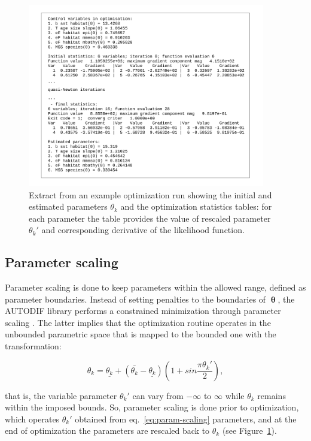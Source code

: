 \begin{figure}[H]
\begin{center}
\includegraphics[width=0.925\textwidth]{chapter4/figs/param_scaling}
\caption{Extract from an example optimization run showing the initial and estimated parameters $\theta_k$ and the optimization statistics tables: for each parameter the table provides the value of rescaled parameter $\theta_k'$ and corresponding derivative of the likelihood function.}
\label{fig:param-scaling}
\end{center}
\end{figure}

\subsection{Parameter scaling}\label{sec:parameter-boundaries}

Parameter scaling is done to keep parameters within the allowed range, defined as parameter boundaries. Instead of setting penalties to the boundaries of $\boldsymbol \uptheta$, the AUTODIF library performs a constrained minimization through parameter scaling \citep*[see e.g.,][]{Bard, Vallino}. The latter implies that the optimization routine operates in the unbounded parametric space that is mapped to the bounded one with the transformation:

\begin{equation}
\theta_k=\underline{\theta_k}+\left(\bar{\theta_k}-\underline{\theta_k}\right)\left(1+sin\frac{\pi\theta_k'}{2}
\right),
\label{eq:param-scaling}
\end{equation}

\noindent that is, the variable parameter $\theta_k'$ can vary from $-\infty$ to $\infty$ while $\theta_k$ remains within the imposed  bounds. So, parameter scaling is done prior to optimization, which operates $\theta_k'$ obtained from eq.~\ref{eq:param-scaling} parameters, and at the end of optimization the parameters are rescaled back to $\theta_k$ (see Figure~\ref{fig:param-scaling}). 


